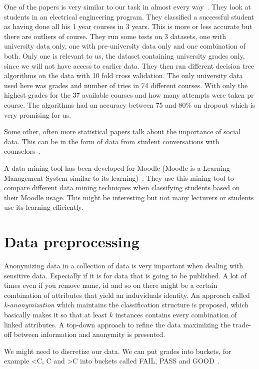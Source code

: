 \bigskip\noindent
One of the papers is very similar to our task in almost every way~\cite{7}.
They look at students in an electrical engineering program. 
They classified a successful student as having done all his 1 year courses in 3 years. 
This is more or less accurate but there are outliers of course. 
They run some tests on 3 datasets, one with university data only, one with pre-university data only and one combination of both. 
Only one is relevant to us, the dataset containing university grades only, since we will not have access to earlier data. 
They then ran different decision tree algorithms on the data with 10 fold cross validation. 
The only university data used here was grades and number of tries in 74 different courses. 
With only the highest grades for the 37 available courses and how many attempts were taken pr course.
The algorithms had an accuracy between 75 and 80\% on dropout which is very promising for us.

\bigskip\noindent
Some other, often more statistical papers talk about the importance of social data. 
This can be in the form of data from student conversations with counselors~\cite{11}.

\bigskip\noindent
A data mining tool has been developed for Moodle (Moodle is a Learning Management System similar to its-learning)~\cite{12}.
They use this mining tool to compare different data mining techniques when classifying students based on their Moodle usage. 
This might be interesting but not many lecturers or students use its-learning efficiently. 

\section{Data preprocessing}
Anonymizing data in a collection of data is very important when dealing with sensitive data. 
Especially if it is for data that is going to be published. 
A lot of times even if you remove name, id and so on there might be a certain combination of attributes that yield an induviduals identity.
An approach called \textit{k-anonymization} which maintains the classification structure is proposed, 
which basically makes it so that at least $k$ instances contains every combination of linked attributes. 
A top-down approach to refine the data maximizing the trade-off between information and anonymity is presented.~\cite{14}

\bigskip\noindent
We might need to discretize our data.
We can put grades into buckets, for example \textless C, C and \textgreater C into buckets called FAIL, PASS and GOOD~\cite{12}.

